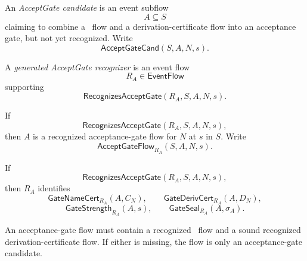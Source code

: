 \begin{definition}
\label{def:deriv-accept-acceptgate-candidate}
An \emph{AcceptGate candidate} is an event subflow
$$
  A\subseteq S
$$
claiming to combine a \NameCert\ flow and a derivation-certificate flow into an acceptance gate, but not yet recognized. Write
$$
  \mathsf{AcceptGateCand}(S,A,N,s).
$$
\end{definition}

\begin{definition}
\label{def:deriv-accept-generated-acceptgate-recognizer}
A \emph{generated AcceptGate recognizer} is an event flow
$$
  R_A\in\mathsf{EventFlow}
$$
supporting
$$
  \mathsf{RecognizesAcceptGate}(R_A,S,A,N,s).
$$
\end{definition}

\begin{definition}
\label{def:deriv-accept-recognized-acceptgate-flow}
If
$$
  \mathsf{RecognizesAcceptGate}(R_A,S,A,N,s),
$$
then $A$ is a recognized acceptance-gate flow for $N$ at $s$ in $S$. Write
$$
  \mathsf{AcceptGateFlow}_{R_A}(S,A,N,s).
$$
\end{definition}

\begin{definition}
\label{def:deriv-accept-acceptgate-components}
If
$$
  \mathsf{RecognizesAcceptGate}(R_A,S,A,N,s),
$$
then $R_A$ identifies
$$
  \mathsf{GateNameCert}_{R_A}(A,C_N),
  \qquad
  \mathsf{GateDerivCert}_{R_A}(A,D_N),
$$
$$
  \mathsf{GateStrength}_{R_A}(A,s),
  \qquad
  \mathsf{GateSeal}_{R_A}(A,\sigma_A).
$$
\end{definition}

\begin{principle}
\label{prin:deriv-accept-no-gate-without-namecert-derivcert}
An acceptance-gate flow must contain a recognized \NameCert\ flow and a sound recognized derivation-certificate flow. If either is missing, the flow is only an acceptance-gate candidate.
\end{principle}

